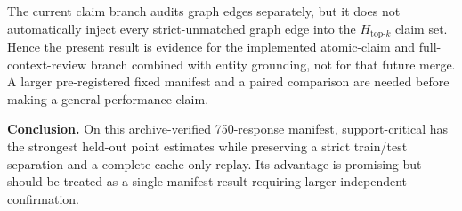 \documentclass[11pt,a4paper]{article}
\newcommand{\Htop}{H_{\mathrm{top}\text{-}k}}
\begin{document}
The current claim branch audits graph edges separately, but it does not automatically inject every strict-unmatched graph edge into the $\Htop$ claim set.  Hence the present result is evidence for the implemented atomic-claim and full-context-review branch combined with entity grounding, not for that future merge.  A larger pre-registered fixed manifest and a paired comparison are needed before making a general performance claim.

\smallskip
\noindent\textbf{Conclusion.} On this archive-verified 750-response manifest, support-critical has the strongest held-out point estimates while preserving a strict train/test separation and a complete cache-only replay.  Its advantage is promising but should be treated as a single-manifest result requiring larger independent confirmation.
\end{document}
